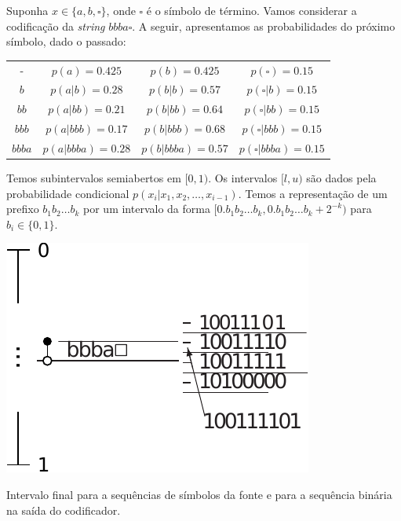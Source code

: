 \begin{example}
Suponha $x \in \{a,b,\square\}$, onde $\square$ é o símbolo de término.
Vamos considerar a codificação da \textit{string} $bbba\square$.
A seguir, apresentamos as probabilidades do próximo símbolo, dado o passado:

\begin{center}
  \begin{tabular}{cccc}
  -  & $p(a) = 0.425$ & $p(b) = 0.425$ & $p(\square) = 0.15$ \\
  $b$  & $p(a|b) = 0.28$ & $p(b|b) = 0.57$ & $p(\square | b) = 0.15$ \\
  $bb$ & $p(a|bb) = 0.21$ & $p(b|bb) = 0.64$ & $p(\square | bb) = 0.15$ \\
  $bbb$ & $p(a|bbb) = 0.17$ & $p(b|bbb) = 0.68$ & $p(\square | bbb) = 0.15$ \\
  $bbba$ & $p(a|bbba) = 0.28$ & $p(b|bbba) = 0.57$ & $p(\square | bbba) = 0.15$
  \end{tabular}
\end{center}

Temos subintervalos semiabertos em $[0,1)$.
Os intervalos $[l,u)$ são dados pela probabilidade condicional $p(x_i | x_1, x_2, \ldots, x_{i-1})$.
Temos a representação de um prefixo $b_1 b_2 \ldots b_k$ por um intervalo da forma
$[0.b_1 b_2 \ldots b_k, 0.b_1 b_2 \ldots b_k + 2^{-k})$ para $b_i \in \{0,1\}$.

\begin{marginfigure}%
  \includegraphics[width=\linewidth]{figures/bbba.pdf}
  \caption{Intervalo final para a sequências de símbolos da fonte e para a sequência binária na saída do codificador.}\label{fig:bbba}
\end{marginfigure}


\end{example}
